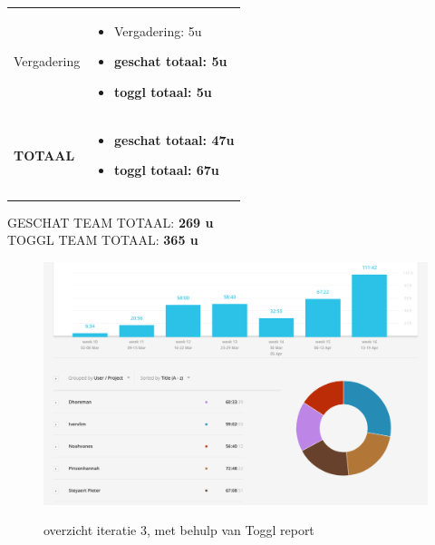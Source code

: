 \documentclass{article}
\begin{document}
\begin{center}
\begin{tabularx}{\textwidth}[t]{XX}
\arrayrulecolor{black}\hline

\vspace{2 mm}
Vergadering & 
\begin{minipage}[t]{\linewidth}%
\vspace{2 mm}
\begin{itemize}
\item Vergadering: 5u
\item \textbf{geschat totaal: 5u}
\item \textbf{toggl totaal: 5u}
\vspace{2 mm}
\end{itemize} 
\end{minipage}\\

\arrayrulecolor{black}\hline

\vspace{2 mm}
\textbf{TOTAAL} & 
\begin{minipage}[t]{\linewidth}%
\vspace{2 mm}
\begin{itemize}
\item \textbf{geschat totaal: 47u}
\item \textbf{toggl totaal: 67u}
\vspace{2 mm}
\end{itemize} 
\end{minipage}\\

\arrayrulecolor{black}\hline

\end{tabularx}
\end{center}

\vspace{4 mm}
\noindent \large{GESCHAT TEAM TOTAAL: \textbf{269 u}}\\
\large{TOGGL TEAM TOTAAL:  \textbf{365 u}}\\


\begin{figure}[h!]
\centering
 \includegraphics[width=160mm]{Toggl_screenshot_iteratie3.pdf}
 \label{toggl_iteratie3}
 \caption{overzicht iteratie 3, met behulp van Toggl report}
\end{figure}
\end{document}
